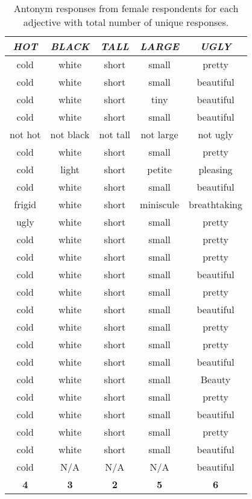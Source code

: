 \begin{table}
	\begin{center}
		\begin{tabular}{|c|c|c|c|c|} \hline
			\textit{HOT} & \textit{BLACK} & \textit{TALL} & \textit{LARGE} & \textit{UGLY} \\ \hline \hline
			cold	&	white	&	short	&	small	&	pretty		\\
			cold	&	white	&	short	&	small	&	beautiful		\\
			cold	&	white	&	short	&	tiny	&	beautiful		\\
			cold	&	white	&	short	&	small	&	beautiful		\\
			not hot	&	not black	&	not tall	&	not large	&	not ugly		\\
			cold	&	white	&	short	&	small	&	pretty		\\
			cold	&	light	&	short	&	petite	&	pleasing		\\
			cold	&	white	&	short	&	small	&	beautiful		\\
			frigid	&	white	&	short	&	miniscule	&	breathtaking		\\
			ugly	&	white	&	short	&	small	&	pretty		\\
			cold	&	white	&	short	&	small	&	pretty		\\
			cold	&	white	&	short	&	small	&	pretty		\\
			cold	&	white	&	short	&	small	&	beautiful		\\
			cold	&	white	&	short	&	small	&	pretty		\\
			cold	&	white	&	short	&	small	&	beautiful		\\
			cold	&	white	&	short	&	small	&	pretty		\\
			cold	&	white	&	short	&	small	&	pretty		\\
			cold	&	white	&	short	&	small	&	beautiful		\\
			cold	&	white	&	short	&	small	&	Beauty 		\\
			cold	&	white	&	short	&	small	&	pretty		\\
			cold	&	white	&	short	&	small	&	beautiful		\\
			cold	&	white	&	short	&	small	&	pretty		\\
			cold	&	white	&	short	&	small	&	beautiful		\\
			cold	&	N/A	&	N/A	&	N/A	&	beautiful		\\ \hline
			\textbf{4}	&	\textbf{3}	&	\textbf{2}	&	\textbf{5}	&	\textbf{6}		\\
			\hline
		\end{tabular}
	\end{center}
	\caption {Antonym responses from female respondents for each adjective with total number of unique responses.}
	\label{tab:female_adjective}
\end{table}

